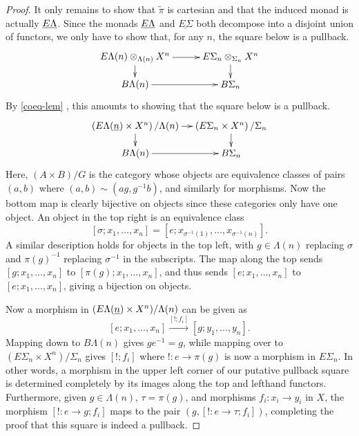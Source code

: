 \begin{proof}
It only remains to show that $\tilde{\pi}$ is cartesian and that the induced monad is actually $\underline{E\Lambda}$. Since the monads $\underline{E\Lambda}$ and $\underline{E\Sigma}$ both decompose into a disjoint union of functors, we only have to show that, for any $n$, the square below is a pullback.
  \[
    \xy
      (0,0)*+{\coeq{\EL}{X}{\Lambda}{n}} ="00";
      (0,-10)*+{B\Lambda(n)} ="01";
      (35,0)*+{E\Sigma_{n} \otimes_{\Sigma_{n}} X^n} ="10";
      (35,-10)*+{B\Sigma_{n}} ="11";
      {\ar^{} "00" ; "10"};
      {\ar^{} "10" ; "11"};
      {\ar^{} "00" ; "01"};
      {\ar^{} "01" ; "11"};
    \endxy
  \]
By \cref{coeq-lem}
, this amounts to showing that the square below is a pullback.
  \[
    \xy
      (0,0)*+{\left(\ELn \times X^n\right)/\Lambda(n)} ="00";
      (0,-10)*+{B\Lambda(n)} ="01";
      (35,0)*+{\left(E\Sigma_{n} \times X^n\right)/\Sigma_{n}} ="10";
      (35,-10)*+{B\Sigma_{n}} ="11";
      {\ar^{} "00" ; "10"};
      {\ar^{} "10" ; "11"};
      {\ar^{} "00" ; "01"};
      {\ar^{} "01" ; "11"};
    \endxy
  \]
Here, $(A \times B)/G$ is the category whose objects are equivalence classes of pairs $(a,b)$ where $(a,b) \sim (ag, g^{-1}b)$, and similarly for morphisms. Now the bottom map is clearly bijective on objects since these categories only have one object. An object in the top right is an equivalence class
  \[
    [\sigma; x_{1}, \ldots, x_{n}] = \left[e; x_{\sigma^{-1}(1)}, \ldots, x_{\sigma^{-1}(n)}\right].
  \]
A similar description holds for objects in the top left, with $g \in \Lambda(n)$ replacing $\sigma$ and $\pi(g)^{-1}$ replacing $\sigma^{-1}$ in the subscripts. The map along the top sends $[g; x_{1}, \ldots, x_{n}]$ to $[\pi(g); x_{1}, \ldots, x_{n}]$, and thus sends $[e; x_{1}, \ldots, x_{n}]$ to $[e; x_{1}, \ldots, x_{n}]$, giving a bijection on objects.

Now a morphism in $(E\Lambda(\underline{n}) \times X^{n})/\Lambda(n)$ can be given as
  \[
    [e; x_{1}, \ldots, x_{n}] \stackrel{[!; f_{i}]}{\longrightarrow} [g; y_{1}, \ldots, y_{n}].
  \]
Mapping down to $B\Lambda(n)$ gives $ge^{-1} = g$, while mapping over to $(E\Sigma_{n} \times X^{n})/\Sigma_{n}$ gives $[!; f_{i}]$ where $! \colon e \rightarrow \pi(g)$ is now a morphism in $E\Sigma_{n}$. In other words, a morphism in the upper left corner of our putative pullback square is determined completely by its images along the top and lefthand functors. Furthermore, given $g \in \Lambda(n)$, $\tau = \pi(g)$, and morphisms $f_{i} \colon x_{i} \rightarrow y_{i}$ in $X$, the morphism $[! \colon e \rightarrow g; f_{i}]$ maps to the pair $(g, [! \colon e \rightarrow \tau; f_{i}])$, completing the proof that this square is indeed a pullback.
\end{proof}

